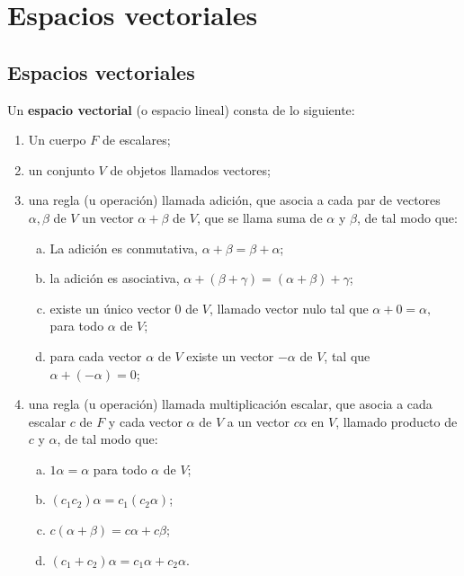 \chapter{Espacios vectoriales}

\section{Espacios vectoriales}

\begin{def.}
    Un \textbf{espacio vectorial} (o espacio lineal) consta de lo siguiente:
    \begin{enumerate}[1.]
	\item Un cuerpo $F$ de escalares;
	\item un conjunto $V$ de objetos llamados vectores;
	\item una regla (u operación) llamada adición, que asocia a cada par de vectores $\alpha,\beta $ de $V$ un vector $\alpha+\beta$ de $V$, que se llama suma de $\alpha$ y $\beta$, de tal modo que:
	   \begin{enumerate}[(a)]
	       \item La adición es conmutativa, $\alpha+\beta=\beta+\alpha$;
	       \item la adición es asociativa, $\alpha+(\beta+\gamma)=(\alpha+\beta)+\gamma$;
	       \item existe un único vector $0$ de $V$, llamado vector nulo tal que $\alpha+0=\alpha,$ para todo $\alpha$ de $V$;
	       \item para cada vector $\alpha$ de $V$ existe un vector $-\alpha$ de $V$, tal que $\alpha+(-\alpha)=0$;
	   \end{enumerate}
       \item una regla (u operación) llamada multiplicación escalar, que asocia a cada escalar $c$ de $F$ y cada vector $\alpha$ de $V$ a un vector $c\alpha$ en $V$, llamado producto de $c$ y $\alpha$, de tal modo que:
	   \begin{enumerate}[(a)]
	       \item $1\alpha=\alpha$ para todo $\alpha$ de $V$;
	       \item $(c_1c_2)\alpha=c_1(c_2\alpha)$;
	       \item $c(\alpha+\beta)=c\alpha+c\beta$;
	       \item $(c_1+c_2)\alpha=c_1\alpha+c_2\alpha$.
	   \end{enumerate}
    \end{enumerate}
\end{def.}


